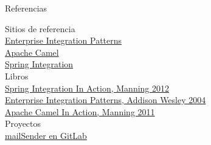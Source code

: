 \documentclass{beamer}
\begin{document}
\begin{frame}{Referencias}
\begin{center}
Sitios de referencia\\
\href{http://www.eaipatterns.com/}{Enterprise Integration Patterns} \\
\href{http://camel.apache.org/}{Apache Camel} \\
\href{http://projects.spring.io/spring-integration/}{Spring Integration} \\
Libros \\
\href{https://www.dropbox.com/s/gwa5p1edxpgudcz/Manning.Spring.Integration.in.Action.Sep.2012.pdf}{Spring Integration In Action, Manning 2012}  \\
\href{https://www.dropbox.com/s/zd9uft4ygbclehn/Addison.Wesley.Enterprise.Integration.Patterns.pdf}{Enterprise Integration Patterns, Addison Wesley 2004} \\
\href{https://www.dropbox.com/s/gjfegd85cvih78a/Manning.Camel.in.Action.Dec.2010.pdf}{Apache Camel In Action, Manning 2011} \\
Proyectos \\
\href{http://gitlab.despegar.it/mail-checker/mail-checker}{mailSender en GitLab}
\end{center}
\end{frame}
\end{document}
